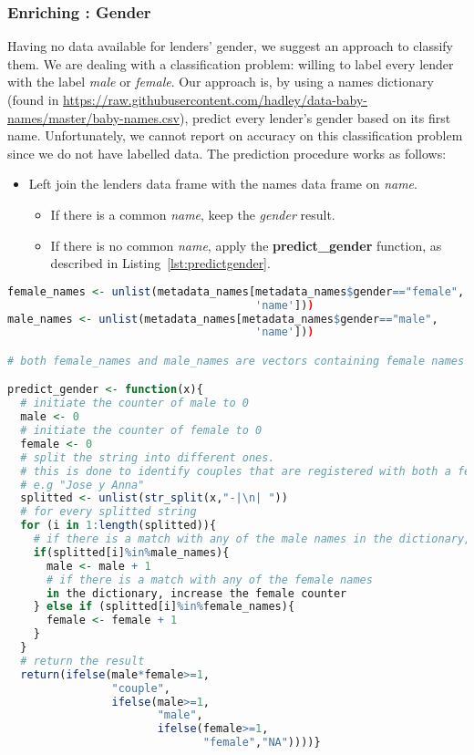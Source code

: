 \subsubsection{Enriching : Gender}
Having no data available for lenders' gender, we suggest an approach to classify them. We are dealing with a classification problem: willing to label every lender with the label \textit{male} or \textit{female}. Our approach is, by using a names dictionary (found in \url{https://raw.githubusercontent.com/hadley/data-baby-names/master/baby-names.csv}), predict every lender's gender based on its first name. Unfortunately, we cannot report on accuracy on this classification problem since we do not have labelled data.
The prediction procedure works as follows:

\begin{itemize}
  \item Left join the lenders data frame with the names data frame on \textit{name}.
\begin{itemize}
    \item If there is a common \textit{name}, keep the \textit{gender} result.
    \item If there is no common \textit{name}, apply the \textbf{predict\_gender} function, as described in Listing~\ref{lst:predictgender}.
\end{itemize}
\end{itemize}

\begin{lstlisting}[language={R}, frame={single}, label={lst:predictgender}, caption={R Code to predict a Lender Loan based on First Name}]
female_names <- unlist(metadata_names[metadata_names$gender=="female",
                                      'name']))
male_names <- unlist(metadata_names[metadata_names$gender=="male",
                                      'name']))

# both female_names and male_names are vectors containing female names and male names

predict_gender <- function(x){
  # initiate the counter of male to 0
  male <- 0
  # initiate the counter of female to 0
  female <- 0
  # split the string into different ones.
  # this is done to identify couples that are registered with both a female and male name
  # e.g "Jose y Anna"
  splitted <- unlist(str_split(x,"-|\n| "))
  # for every splitted string
  for (i in 1:length(splitted)){
    # if there is a match with any of the male names in the dictionary, increase the male counter
    if(splitted[i]%in%male_names){
      male <- male + 1
      # if there is a match with any of the female names
      in the dictionary, increase the female counter
    } else if (splitted[i]%in%female_names){
      female <- female + 1
    }
  }
  # return the result
  return(ifelse(male*female>=1,
                "couple",
                ifelse(male>=1,
                       "male",
                       ifelse(female>=1,
                              "female","NA"))))}

\end{lstlisting}

